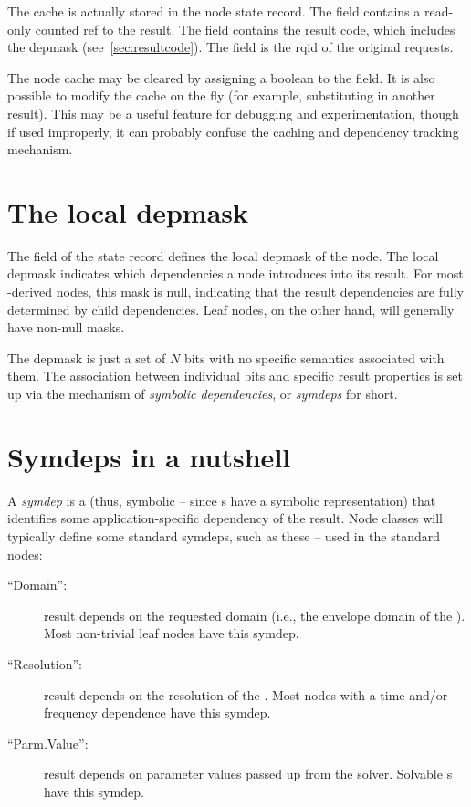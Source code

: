   The cache is actually stored in the node state record. The 
  field contains a read-only counted ref to the result. The
   field contains the result code, which includes the
  depmask (see~\ref{sec:resultcode}). The  field is the rqid of
  the original requests.

  The node cache may be cleared by assigning a boolean  to the
   field. It is also possible to modify the cache on the fly
  (for example, substituting in another result). This may be a useful feature
  for debugging and experimentation, though if used improperly, it can probably
  confuse the caching and dependency tracking mechanism.  
  
\section{The local depmask}
  
  The  field of the state record defines the local depmask of
  the node. The local depmask indicates which dependencies a node introduces
  into its result. For most -derived nodes, this mask is null,
  indicating that the result dependencies are fully determined by child
  dependencies. Leaf nodes, on the other hand, will generally have non-null
  masks.

  The depmask is just a set of $N$ bits with no specific semantics associated
  with them. The association between individual bits and specific result
  properties is set up via the mechanism of {\em symbolic dependencies}, or
  {\em symdeps} for short.

\section{Symdeps in a nutshell}
  
  A {\em symdep} is a  (thus, symbolic -- since s have a
  symbolic representation) that identifies some application-specific dependency
  of the result. Node classes will typically define some standard symdeps, such
  as these -- used in the standard nodes:

  \begin{description}
  
  \item[``Domain'':] result depends on the requested domain (i.e., the envelope
    domain of the \Cells). Most non-trivial leaf nodes have this symdep.

  \item[``Resolution'':] result depends on the resolution of the \Cells. Most
    nodes with a time and/or frequency dependence have this symdep.
   
  \item[``Parm.Value'':] result depends on parameter values passed up from the
    solver. Solvable \Parm{}s have this symdep.
  
  \end{description}
  
